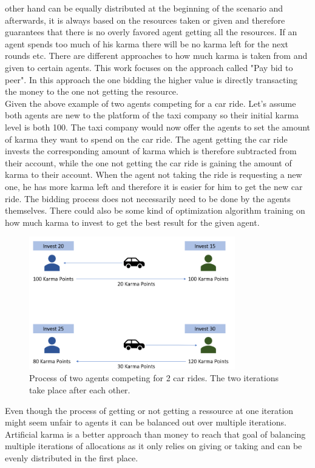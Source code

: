 \documentclass[german, a4paper, 11pt, oneside]{scrbook}
\begin{document}
other hand can be equally distributed at the beginning of the scenario and afterwards, it is always based on the resources taken or given and therefore guarantees that there is no overly favored agent getting all the resources. If an agent spends too much of his karma there will be no karma left for the next rounds etc.  \cite{Elokda.2023}
There are different approaches to how much karma is taken from and given to certain agents. This work focuses on the approach called "Pay bid to peer". In this approach the one bidding the higher value is directly transacting the money to the one not getting the resource. \cite{Elokda.2023} \\Given the above example of two agents competing for a car ride. Let's assume both agents are new to the platform of the taxi company so their initial karma level is both 100. The taxi company would now offer the agents to set the amount of karma they want to spend on the car ride. The agent getting the car ride invests the corresponding amount of karma which is therefore subtracted from their account, while the one not getting the car ride is gaining the amount of karma to their account. When the agent not taking the ride is requesting a new one, he has more karma left and therefore it is easier for him to get the new car ride. The bidding process does not necessarily need to be done by the agents themselves. There could also be some kind of optimization algorithm training on how much karma to invest to get the best result for the given agent.
\begin{figure}[h]
\centering
\includegraphics[width=0.8\textwidth]{AK}
\caption{Process of two agents competing for 2 car rides. The two iterations take place after each other.}
\end{figure}
Even though the process of getting or not getting a ressource at one iteration might seem unfair to agents it can be balanced out over multiple iterations. Artificial karma is a better approach than money to reach that goal of balancing multiple iterations of allocations as it only relies on giving or taking and can be evenly distributed in the first place. \cite{Elokda.2023}
\end{document}
